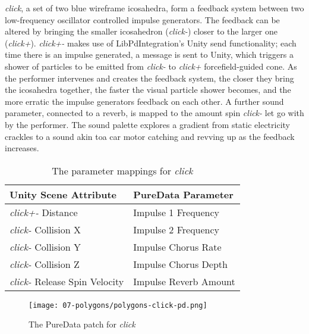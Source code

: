 \textit{click}, a set of two blue wireframe icosahedra, form a feedback system between two low-frequency oscillator controlled impulse generators. The feedback can be altered by bringing the smaller icosahedron (\textit{click-}) closer to the larger one (\textit{click+}). \textit{click+-} makes use of LibPdIntegration's Unity send functionality; each time there is an impulse generated, a message is sent to Unity, which triggers a shower of particles to be emitted from \textit{click-} to \textit{click+} forcefield-guided cone. As the performer intervenes and creates the feedback system, the closer they bring the icosahedra together, the faster the visual particle shower becomes, and the more erratic the impulse generators feedback on each other. A further sound parameter, connected to a reverb, is mapped to the amount spin \textit{click-} let go with by the performer. The sound palette explores a gradient from static electricity crackles to a sound akin toa car motor catching and revving up as the feedback increases.
\begin{table}
    \centering
    \begin{tabular}{ l|l }
        \textbf{Unity Scene Attribute}         & \textbf{PureData Parameter}   \\
        \hline      
        \textit{click+-} Distance              & Impulse 1 Frequency           \\
        \textit{click-} Collision X            & Impulse 2 Frequency           \\
        \textit{click-} Collision Y            & Impulse Chorus Rate           \\
        \textit{click-} Collision Z            & Impulse Chorus Depth          \\
        \textit{click-} Release Spin Velocity  & Impulse Reverb Amount     
    \end{tabular}
    \caption{The parameter mappings for \textit{click}}
    \label{fig: polygons-click-mapping}
\end{table}
\begin{figure}
    \centering
    \texttt{[image: 07-polygons/polygons-click-pd.png]}
    \caption{The PureData patch for \textit{click}}
    \label{fig: polygons-click-pd}
\end{figure}

